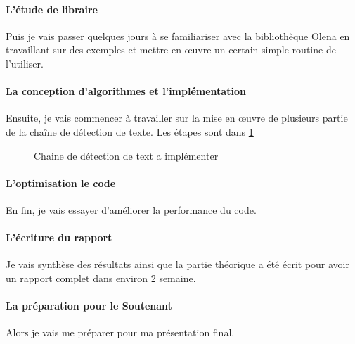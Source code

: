 \documentclass[12pt,a4paper]{article}
\begin{document}
	\paragraph{L'étude de libraire}
	Puis je vais passer quelques jours à se familiariser avec la bibliothèque Olena en travaillant sur des exemples et mettre en œuvre un certain simple routine de l'utiliser.
	\paragraph{La conception d'algorithmes et l'implémentation}
	Ensuite, je vais commencer à travailler sur la mise en œuvre de plusieurs partie de la chaîne de détection de texte. Les étapes sont dans \ref{Process}
	
\begin{figure}
 \begin{center}
  \caption{Chaine de détection de text a implémenter}
  \label{Process}
 \end{center}
\end{figure}

	\paragraph{L'optimisation le code}
	En fin, je vais essayer d'améliorer la performance du code.
	\paragraph{L'écriture du rapport}
	Je vais synthèse des résultats ainsi que la partie théorique a été écrit pour avoir un rapport complet dans environ 2 semaine.
	\paragraph{La préparation pour le Soutenant}
	Alors je vais me préparer pour ma présentation final.
\end{document}
